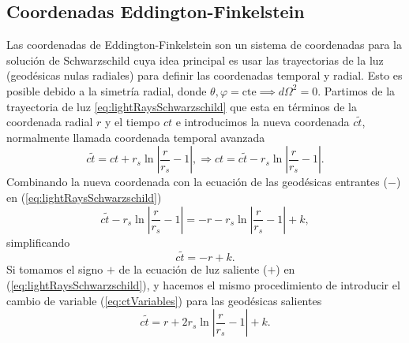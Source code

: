 \subsection{Coordenadas Eddington-Finkelstein}
Las coordenadas de Eddington-Finkelstein son un sistema de coordenadas para la solución de Schwarzschild cuya idea principal es usar las trayectorias de la luz (geodésicas nulas radiales) para definir las coordenadas temporal y radial. Esto es posible debido a la simetría radial, donde \( \theta, \varphi = \text{cte} \implies d\Omega^2 = 0 \).
Partimos de la trayectoria de luz \ref{eq:lightRaysSchwarzschild} que esta en términos de la coordenada radial \( r \) y el tiempo \( ct \) e introducimos la nueva coordenada \( c\tilde{t} \), normalmente llamada coordenada temporal avanzada
\begin{equation}
        c\tilde{t}  = ct + r_s \ln \left| \frac{r}{r_s} - 1 \right|,      \Rightarrow 
        ct         = c\tilde{t} - r_s \ln \left| \frac{r}{r_s} - 1 \right|.
    \label{eq:ctVariables}
\end{equation}
Combinando la nueva coordenada con la ecuación de las geodésicas entrantes (\( - \)) en (\ref{eq:lightRaysSchwarzschild})
\begin{equation}
    c\tilde{t} - r_s \ln \left| \frac{r}{r_s} - 1 \right| = -r - r_s \ln \left| \frac{r}{r_s} - 1 \right| + k,
\end{equation}
simplificando 
\begin{equation}
    c\tilde{t} = -r + k  .
\label{eq:ctVariablesIn}
\end{equation}
Si tomamos el signo \( + \) de la ecuación de luz saliente (\( + \)) en (\ref{eq:lightRaysSchwarzschild}), y hacemos el mismo procedimiento de introducir el cambio de variable (\ref{eq:ctVariables}) para las geodésicas salientes
\begin{equation}
    c\tilde{t} = r + 2 r_s \ln \left| \frac{r}{r_s} - 1 \right| + k.
\end{equation}

